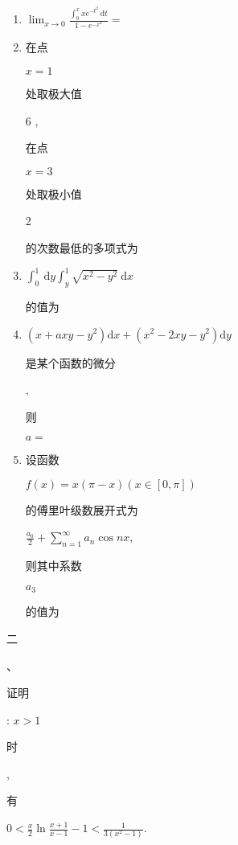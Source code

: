 \documentclass[10pt]{article}
\begin{document}
\begin{enumerate}
  \item $\lim _{x \rightarrow 0} \frac{\int_{0}^{x} x e^{-t^{2}} \mathrm{~d} t}{1-e^{-x^{2}}}=$

  \item \begin{CJK}{UTF8}{mj}在点\end{CJK} $x=1$ \begin{CJK}{UTF8}{mj}处取极大值\end{CJK} 6 , \begin{CJK}{UTF8}{mj}在点\end{CJK} $x=3$ \begin{CJK}{UTF8}{mj}处取极小值\end{CJK} 2 \begin{CJK}{UTF8}{mj}的次数最低的多项式为\end{CJK}

  \item $\int_{0}^{1} \mathrm{~d} y \int_{y}^{1} \sqrt{x^{2}-y^{2}} \mathrm{~d} x$ \begin{CJK}{UTF8}{mj}的值为\end{CJK}

  \item $\left(x+a x y-y^{2}\right) \mathrm{d} x+\left(x^{2}-2 x y-y^{2}\right) \mathrm{d} y$ \begin{CJK}{UTF8}{mj}是某个函数的微分\end{CJK}, \begin{CJK}{UTF8}{mj}则\end{CJK} $a=$

  \item \begin{CJK}{UTF8}{mj}设函数\end{CJK} $f(x)=x(\pi-x)(x \in[0, \pi])$ \begin{CJK}{UTF8}{mj}的傅里叶级数展开式为\end{CJK} $\frac{a_{0}}{2}+\sum_{n=1}^{\infty} a_{n} \cos n x$, \begin{CJK}{UTF8}{mj}则其中系数\end{CJK} $a_{3}$ \begin{CJK}{UTF8}{mj}的值为\end{CJK}

\end{enumerate}
\begin{CJK}{UTF8}{mj}二\end{CJK}、\begin{CJK}{UTF8}{mj}证明\end{CJK}: $x>1$ \begin{CJK}{UTF8}{mj}时\end{CJK}, \begin{CJK}{UTF8}{mj}有\end{CJK} $0<\frac{x}{2} \ln \frac{x+1}{x-1}-1<\frac{1}{3\left(x^{2}-1\right)}$.
\end{document}
